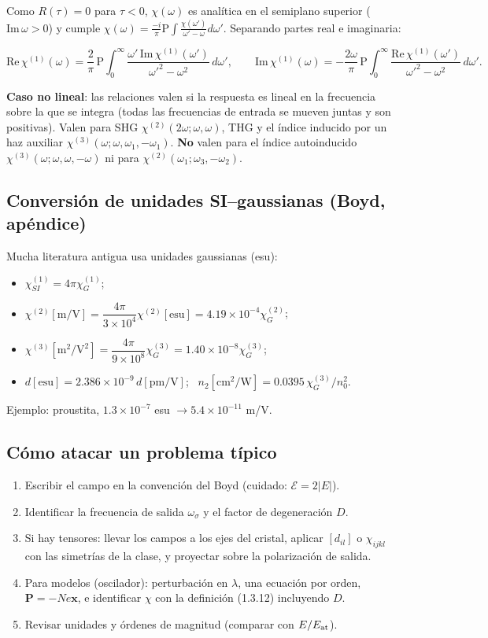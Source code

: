 \documentclass[10pt]{article}
\begin{document}
Como $R(\tau)=0$ para $\tau<0$, $\chi(\omega)$ es analítica en el semiplano superior ($\mathrm{Im}\,\omega>0$) y cumple $\chi(\omega)=\frac{-i}{\pi}\mathrm{P}\!\int\frac{\chi(\omega')}{\omega'-\omega}d\omega'$. Separando partes real e imaginaria:
\begin{clave}[title={Kramers–Kronig en la convención del Boyd (1.7.9)}]
\[
\mathrm{Re}\,\chi^{(1)}(\omega)=\frac2\pi\,\mathrm P\!\int_0^\infty\frac{\omega'\,\mathrm{Im}\,\chi^{(1)}(\omega')}{\omega'^2-\omega^2}\,d\omega',\qquad
\mathrm{Im}\,\chi^{(1)}(\omega)=-\frac{2\omega}\pi\,\mathrm P\!\int_0^\infty\frac{\mathrm{Re}\,\chi^{(1)}(\omega')}{\omega'^2-\omega^2}\,d\omega'.
\]
\end{clave}
\textbf{Caso no lineal}: las relaciones valen si la respuesta es lineal en la frecuencia sobre la que se integra (todas las frecuencias de entrada se mueven juntas y son positivas). Valen para SHG $\chi^{(2)}(2\omega;\omega,\omega)$, THG y el índice inducido por un haz auxiliar $\chi^{(3)}(\omega;\omega,\omega_1,-\omega_1)$. \textbf{No} valen para el índice autoinducido $\chi^{(3)}(\omega;\omega,\omega,-\omega)$ ni para $\chi^{(2)}(\omega_1;\omega_3,-\omega_2)$.

\subsection{Conversión de unidades SI–gaussianas (Boyd, apéndice)}
Mucha literatura antigua usa unidades gaussianas (esu):
\begin{itemize}
\item $\chi^{(1)}_{SI}=4\pi\chi^{(1)}_{G}$;
\item $\chi^{(2)}[\mathrm{m/V}]=\dfrac{4\pi}{3\times10^4}\chi^{(2)}[\mathrm{esu}]=4.19\times10^{-4}\chi^{(2)}_G$;
\item $\chi^{(3)}[\mathrm{m^2/V^2}]=\dfrac{4\pi}{9\times10^8}\chi^{(3)}_G=1.40\times10^{-8}\chi^{(3)}_G$;
\item $d[\mathrm{esu}]=2.386\times10^{-9}\,d[\mathrm{pm/V}]$; \ $n_2[\mathrm{cm^2/W}]=0.0395\,\chi^{(3)}_G/n_0^2$.
\end{itemize}
Ejemplo: proustita, $1.3\times10^{-7}$ esu $\to5.4\times10^{-11}$ m/V.

\subsection{Cómo atacar un problema típico}
\begin{enumerate}
\item Escribir el campo en la convención del Boyd (cuidado: $\mathcal E=2|E|$).
\item Identificar la frecuencia de salida $\omega_\sigma$ y el factor de degeneración $D$.
\item Si hay tensores: llevar los campos a los ejes del cristal, aplicar $[d_{il}]$ o $\chi_{ijkl}$ con las simetrías de la clase, y proyectar sobre la polarización de salida.
\item Para modelos (oscilador): perturbación en $\lambda$, una ecuación por orden, $\mathbf P=-Ne\mathbf x$, e identificar $\chi$ con la definición (1.3.12) incluyendo $D$.
\item Revisar unidades y órdenes de magnitud (comparar con $E/E_{\rm at}$).
\end{enumerate}
\end{document}
